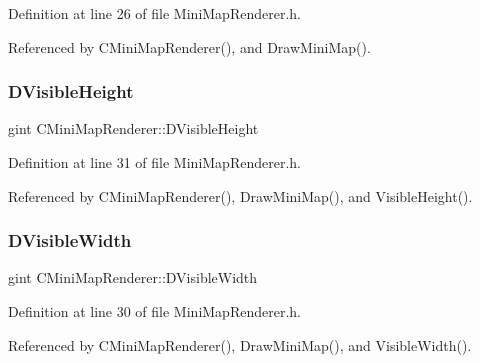 Definition at line 26 of file Mini\+Map\+Renderer.\+h.



Referenced by C\+Mini\+Map\+Renderer(), and Draw\+Mini\+Map().

\hypertarget{classCMiniMapRenderer_aad56353e51a1a3da66d3428cf0f1ccf8}{}\label{classCMiniMapRenderer_aad56353e51a1a3da66d3428cf0f1ccf8} 
\subsubsection{\texorpdfstring{D\+Visible\+Height}{DVisibleHeight}}
{\footnotesize\ttfamily gint C\+Mini\+Map\+Renderer\+::\+D\+Visible\+Height\hspace{0.3cm}{\ttfamily [protected]}}



Definition at line 31 of file Mini\+Map\+Renderer.\+h.



Referenced by C\+Mini\+Map\+Renderer(), Draw\+Mini\+Map(), and Visible\+Height().

\hypertarget{classCMiniMapRenderer_aedcb790a697e6f606cd7fa5089a41359}{}\label{classCMiniMapRenderer_aedcb790a697e6f606cd7fa5089a41359} 
\subsubsection{\texorpdfstring{D\+Visible\+Width}{DVisibleWidth}}
{\footnotesize\ttfamily gint C\+Mini\+Map\+Renderer\+::\+D\+Visible\+Width\hspace{0.3cm}{\ttfamily [protected]}}



Definition at line 30 of file Mini\+Map\+Renderer.\+h.



Referenced by C\+Mini\+Map\+Renderer(), Draw\+Mini\+Map(), and Visible\+Width().

\hypertarget{classCMiniMapRenderer_ad5f723d83a60882a3e82af72e84ff522}{}\label{classCMiniMapRenderer_ad5f723d83a60882a3e82af72e84ff522} 
